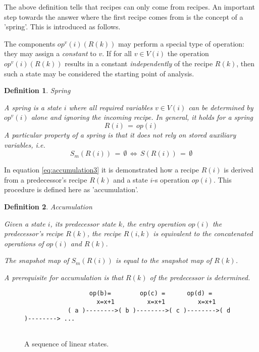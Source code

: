 \documentclass[12pt,a4paper]{scrartcl}
\newtheorem{definition}{Definition}
\begin{document}
The above definition tells that recipes can only come from recipes. An
important step towards the answer where the first recipe comes from is the
concept of a 'spring'. This is introduced as follows. 

The components $op^v(i)(R(k))$ may perform a special type of operation: they
may assign a \textit{constant} to $v$. If for all $v\in V(i)$ the operation
$op^v(i)(R(k))$ results in a constant \textit{independently} of the recipe
$R(k)$, then such a state may be considered the starting point of analysis. 

\begin{definition}
Spring

A spring is a state $i$ where all required variables $v\in V(i)$ can be
determined by $op^v(i)$ alone and ignoring the incoming recipe. In general,
it holds for a spring
\begin{equation}
    R(i)\,=\,op(i)
\end{equation}
A particular
property of a spring is that it does not rely on stored auxiliary variables, i.e.
\begin{equation} \label{eq:spring-no-aux}
    S_m(R(i))\,=\,\emptyset\,\Leftrightarrow\,S(R(i))\,=\,\emptyset
\end{equation}
\end{definition}

In equation \eqref{eq:accumulation3} it is demonstrated how a recipe $R(i)$ is
derived from a predecessor's recipe $R(k)$ and a state $i$-s operation $op(i)$.
This procedure is defined here as 'accumulation'.

\begin{definition}
Accumulation

Given a state $i$, its predecessor state $k$, the entry operation $op(i)$
the predecessor's recipe $R(k)$, the recipe $R(i,k)$ is equivalent
to the concatenated operations of $op(i)$ and $R(k)$.

The snapshot map of $S_m(R(i))$ is equal to the snapshot map of $R(k)$.

A prerequisite for accumulation is that $R(k)$ of the predecessor is 
determined.
\end{definition}

\begin{figure}[htbp] \leavevmode
\begin{verbatim}
                  op(b)=        op(c) =      op(d) =
                    x=x+1         x=x+1         x=x+1        
            ( a )-------->( b )-------->( c )-------->( d )--------> ...


\end{verbatim}
\caption{A sequence of linear states.}
\end{figure}
\end{document}
